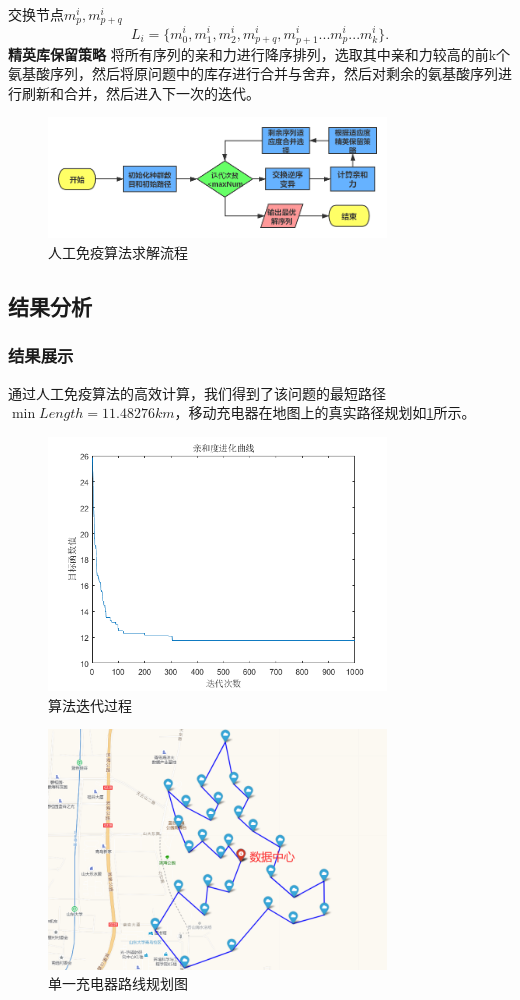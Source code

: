 \documentclass{whutmod}
\begin{document}
交换节点$m_p^i,m_{p+q}^i$
$$L_i=\{m_0^i,m_1^i,m_2^i,m_{p+q}^i,m_{p+1}^i...m_p^i...m_k^i\}.$$
\textbf{精英库保留策略}
将所有序列的亲和力进行降序排列，选取其中亲和力较高的前k个氨基酸序列，然后将原问题中的库存进行合并与舍弃，然后对剩余的氨基酸序列进行刷新和合并，然后进入下一次的迭代。
\begin{figure}[!h]
	\centering
	\includegraphics[width=0.8\textwidth]{IATSP.png}
	\caption{人工免疫算法求解流程}
\end{figure}
\subsection{结果分析}
\subsubsection{结果展示}
通过人工免疫算法的高效计算，我们得到了该问题的最短路径$\min Length=11.48276km$，移动充电器在地图上的真实路径规划如\ref{IAroute}所示。
\begin{figure}[!h]
	\centering
	\includegraphics[width=0.8\textwidth]{IA.png}
	\caption{算法迭代过程}
\end{figure}
\begin{figure}[!h]
	\centering
	\includegraphics[width=0.8\textwidth]{route1.png}
	\caption{单一充电器路线规划图}
	\label{IAroute}
\end{figure}
\end{document}
